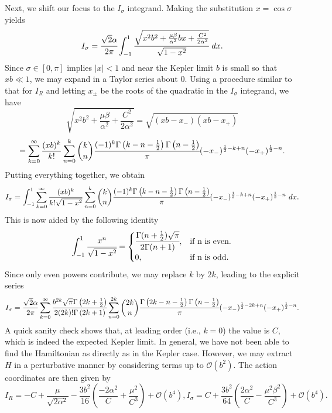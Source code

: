 \documentclass[12pt,oneside]{report}
\theoremstyle{definition}
\begin{document}
Next, we shift our focus to the \(I_{\sigma}\) integrand. Making the substitution \(x = \cos\sigma\) yields
$$I_{\sigma} = \cfrac{\sqrt{2}\alpha}{2\pi}\int_{-1}^{1}\cfrac{\sqrt{x^{2}b^{2}+\frac{\mu\beta}{\alpha^{2}}  b x+\frac{C^{2}}{2\alpha^{2}}}}{\sqrt{1-x^{2}}} \ dx.$$
Since \(\sigma \in [0,\pi]\) implies \(|x|<1\) and near the Kepler limit \(b\) is small so that \(xb \ll 1\), we may expand in a Taylor series about 0. Using a procedure similar to that for \(I_{R}\) and letting \(x_{\pm}\) be the roots of the quadratic in the \(I_{\sigma}\) integrand, we have
$$\sqrt{x^{2}b^{2}+\frac{\mu \beta}{\alpha^{2}} + \frac{C^{2}}{2\alpha^{2}}} = \sqrt{(xb-x_{-})(xb-x_{+})}$$
$$ = \sum_{k=0}^{\infty}\frac{(xb)^{k}}{k!}\sum_{n=0}^{k}\binom{k}{n}\cfrac{(-1)^{k} \Gamma \left(k-n-\frac{1}{2} \right) \Gamma \left(n-\frac{1}{2} \right) }{\pi}(-x_{-})^{\frac{1}{2}-k+n}(-x_{+})^{\frac{1}{2}-n}.$$
Putting everything together, we obtain
$$ I_{\sigma}= \int_{-1}^{1}\sum_{k=0}^{\infty}\frac{(xb)^{k}}{k!\sqrt{1-x^{2}}}\sum_{n=0}^{k}\binom{k}{n}\cfrac{(-1)^{k} \Gamma \left(k-n-\frac{1}{2}\right) \Gamma \left(n-\frac{1}{2} \right) }{\pi}(-x_{-})^{\frac{1}{2}-k+n}(-x_{+})^{\frac{1}{2}-n} \ dx. $$
This is now aided by the following identity
\begin{equation}
  \int_{-1}^{1} \cfrac{x^{n}}{\sqrt{1-x^{2}}}=\begin{cases}
    \cfrac{\Gamma(n+\frac{1}{2})\sqrt{\pi}}{2\Gamma(n+1)}, & \text{if n is even}.\\
    0, & \text{if n is odd}.
  \end{cases}
\end{equation}
Since only even powers contribute, we may replace \(k\) by \(2k\), leading to the explicit series
$$I_{\sigma} = \frac{\sqrt{2}\alpha}{2\pi}\sum_{k=0}^{\infty}\cfrac{b^{2k}\sqrt{\pi}\Gamma \left(2k+\frac{1}{2}\right)}{2(2k)! \Gamma\left(2k+1\right)}\sum_{n=0}^{2k}\binom{2k}{n}\cfrac{ \Gamma \left(2k-n-\frac{1}{2}\right) \Gamma \left(n-\frac{1}{2} \right) }{\pi}(-x_{-})^{\frac{1}{2}-2k+n}(-x_{+})^{\frac{1}{2}-n}.$$
A quick sanity check shows that, at leading order (i.e., \(k=0\)) the value is \(C\), which is indeed the expected Kepler limit. In general, we have not been able to find the Hamiltonian as directly as in the Kepler case. However, we may extract \(H\) in a perturbative manner by considering terms up to \(\mathcal{O}(b^{2})\). The action coordinates are then given by
\begin{subequations}
    \begin{equation}\label{IR ham pert}
      I_{R}  = -C+\frac{\mu}{\sqrt{2\alpha^{2}}} -\frac{3b^{2}} {16}\left(\frac{-2\alpha^{2}}{C}+\frac{\mu^{2}}{C^{3}}\right) + \mathcal{O}(b^{4}),  
    \end{equation}
    \begin{equation}
      I_{\sigma} =  C + \frac{3b^{2}}{64}\left(\frac{2\alpha^{2}}{C}-\frac{\mu^{2}\beta^{2}}{C^{3}}\right) + \mathcal{O}(b^{4}).  
    \end{equation}
\end{subequations}
\end{document}
